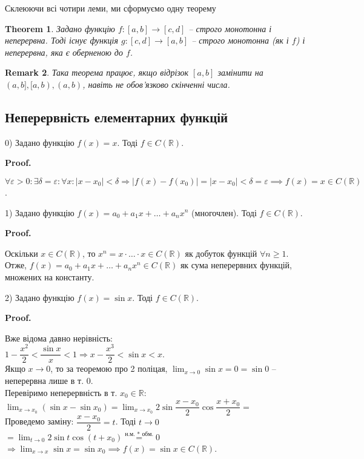 \documentclass[a4paper, 14pt]{article}
\makeatletter
\def\qed{$\blacksquare$}
\theoremstyle{theoremdd}
\newtheorem{theorem}{Theorem}[subsection]
\theoremstyle{theoremdd}
\theoremstyle{theoremdd}
\theoremstyle{theoremdd}
\theoremstyle{theoremdd}
\theoremstyle{theoremdd}
\newtheorem{remark}[theorem]{Remark}
\theoremstyle{theoremdd}
\theoremstyle{theoremdd}
\renewenvironment{proof}[1][Proof.\\]{\par
\pushQED{\hfill \qed}%
\normalfont \topsep6\p@\@plus6\p@\relax
\trivlist
\item\relax
{\bfseries
#1\@addpunct{.}}\hspace\labelsep\ignorespaces
}{%
\popQED\endtrivlist\@endpefalse
}
\makeatother
\begin{document}
Склеюючи всі чотири леми, ми сформуємо одну теорему

\begin{theorem}
Задано функцію $f \colon [a,b] \to [c,d]$ -- строго монотонна і неперервна. Тоді існує функція $g \colon [c,d] \to [a,b]$ -- строго монотонна (як і $f$) і неперервна, яка є оберненою до $f$.
\end{theorem}

\begin{remark}
Така теорема працює, якщо відрізок $[a,b]$ замінити на $(a,b],[a,b),(a,b)$, навіть не обов'язково скінченні числа.
\end{remark}

\subsection{Неперервність елементарних функцій}
0) Задано функцію $f(x) = x$. Тоді $f \in C(\mathbb{R})$.
\begin{proof}
$\forall \varepsilon > 0: \exists \delta = \varepsilon: \forall x: |x-x_0|<\delta \Rightarrow |f(x)-f(x_0)| = |x-x_0|<\delta = \varepsilon \implies f(x) = x \in C(\mathbb{R})$.
\end{proof}

1) Задано функцію $f(x) = a_0 + a_1 x + \dots + a_n x^n$ (многочлен). Тоді $f \in C(\mathbb{R})$.
\begin{proof}
Оскільки $x \in C(\mathbb{R})$, то $x^n = x \cdot \dots \cdot x \in C(\mathbb{R})$ як добуток функцій $\forall n \geq 1$. Отже, $f(x) = a_0 + a_1 x + \dots + a_n x^n \in C(\mathbb{R})$ як сума неперервних функцій, множених на константу.
\end{proof}

2) Задано функцію $f(x) = \sin x$. Тоді $f \in C(\mathbb{R})$.
\begin{proof}
Вже відома давно нерівність:\\
$1 - \dfrac{x^2}{2} < \dfrac{\sin x}{x} < 1 \Rightarrow x - \dfrac{x^3}{2} < \sin x < x$.\\
Якщо $x \to 0$, то за теоремою про 2 поліцая, $\displaystyle \lim_{x \to 0} \sin x = 0 = \sin 0$ -- неперервна лише в т. $0$.\\
Перевіримо неперервність в т. $x_0 \in \mathbb{R}$:\\
$\displaystyle \lim_{x \to x_0} (\sin x - \sin x_0) = \lim_{x \to x_0} 2 \sin \dfrac{x-x_0}{2} \cos \dfrac{x+x_0}{2} \boxed{=} $\\
Проведемо заміну: $\dfrac{x-x_0}{2} = t$. Тоді $t \to 0$\\
$\boxed{=} \displaystyle \lim_{t \to 0} 2 \sin t \cos (t+x_0) \overset{\text{н.м. * обм.}}{=} 0$
$\Rightarrow \displaystyle \lim_{x \to x} \sin x = \sin x_0 \implies f(x) = \sin x \in C(\mathbb{R})$.
\end{proof}
\end{document}
